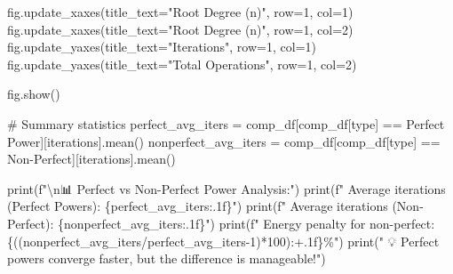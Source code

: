 \documentclass[
  letterpaper,
  DIV=11,
  numbers=noendperiod]{scrartcl}
\newenvironment{Shaded}{\begin{snugshade}}{\end{snugshade}}
\newcommand{\BuiltInTok}[1]{\textcolor[rgb]{0.00,0.23,0.31}{#1}}
\newcommand{\CharTok}[1]{\textcolor[rgb]{0.13,0.47,0.30}{#1}}
\newcommand{\CommentTok}[1]{\textcolor[rgb]{0.37,0.37,0.37}{#1}}
\newcommand{\DecValTok}[1]{\textcolor[rgb]{0.68,0.00,0.00}{#1}}
\newcommand{\NormalTok}[1]{\textcolor[rgb]{0.00,0.23,0.31}{#1}}
\newcommand{\OperatorTok}[1]{\textcolor[rgb]{0.37,0.37,0.37}{#1}}
\newcommand{\SpecialCharTok}[1]{\textcolor[rgb]{0.37,0.37,0.37}{#1}}
\newcommand{\SpecialStringTok}[1]{\textcolor[rgb]{0.13,0.47,0.30}{#1}}
\newcommand{\StringTok}[1]{\textcolor[rgb]{0.13,0.47,0.30}{#1}}
\begin{document}
\begin{Shaded}
\begin{Highlighting}[]
\NormalTok{fig.update\_xaxes(title\_text}\OperatorTok{=}\StringTok{"Root Degree (n)"}\NormalTok{, row}\OperatorTok{=}\DecValTok{1}\NormalTok{, col}\OperatorTok{=}\DecValTok{1}\NormalTok{)}
\NormalTok{fig.update\_xaxes(title\_text}\OperatorTok{=}\StringTok{"Root Degree (n)"}\NormalTok{, row}\OperatorTok{=}\DecValTok{1}\NormalTok{, col}\OperatorTok{=}\DecValTok{2}\NormalTok{)}
\NormalTok{fig.update\_yaxes(title\_text}\OperatorTok{=}\StringTok{"Iterations"}\NormalTok{, row}\OperatorTok{=}\DecValTok{1}\NormalTok{, col}\OperatorTok{=}\DecValTok{1}\NormalTok{)}
\NormalTok{fig.update\_yaxes(title\_text}\OperatorTok{=}\StringTok{"Total Operations"}\NormalTok{, row}\OperatorTok{=}\DecValTok{1}\NormalTok{, col}\OperatorTok{=}\DecValTok{2}\NormalTok{)}

\NormalTok{fig.show()}


\CommentTok{\# Summary statistics}
\NormalTok{perfect\_avg\_iters }\OperatorTok{=}\NormalTok{ comp\_df[comp\_df[}\StringTok{\textquotesingle{}type\textquotesingle{}}\NormalTok{] }\OperatorTok{==} \StringTok{\textquotesingle{}Perfect Power\textquotesingle{}}\NormalTok{][}\StringTok{\textquotesingle{}iterations\textquotesingle{}}\NormalTok{].mean()}
\NormalTok{nonperfect\_avg\_iters }\OperatorTok{=}\NormalTok{ comp\_df[comp\_df[}\StringTok{\textquotesingle{}type\textquotesingle{}}\NormalTok{] }\OperatorTok{==} \StringTok{\textquotesingle{}Non{-}Perfect\textquotesingle{}}\NormalTok{][}\StringTok{\textquotesingle{}iterations\textquotesingle{}}\NormalTok{].mean()}

\BuiltInTok{print}\NormalTok{(}\SpecialStringTok{f"}\CharTok{\textbackslash{}n}\SpecialStringTok{📊 Perfect vs Non{-}Perfect Power Analysis:"}\NormalTok{)}
\BuiltInTok{print}\NormalTok{(}\SpecialStringTok{f"   Average iterations (Perfect Powers): }\SpecialCharTok{\{}\NormalTok{perfect\_avg\_iters}\SpecialCharTok{:.1f\}}\SpecialStringTok{"}\NormalTok{)}
\BuiltInTok{print}\NormalTok{(}\SpecialStringTok{f"   Average iterations (Non{-}Perfect): }\SpecialCharTok{\{}\NormalTok{nonperfect\_avg\_iters}\SpecialCharTok{:.1f\}}\SpecialStringTok{"}\NormalTok{)}
\BuiltInTok{print}\NormalTok{(}\SpecialStringTok{f"   Energy penalty for non{-}perfect: }\SpecialCharTok{\{}\NormalTok{((nonperfect\_avg\_iters}\OperatorTok{/}\NormalTok{perfect\_avg\_iters}\OperatorTok{{-}}\DecValTok{1}\NormalTok{)}\OperatorTok{*}\DecValTok{100}\NormalTok{)}\SpecialCharTok{:+.1f\}}\SpecialStringTok{\%"}\NormalTok{)}
\BuiltInTok{print}\NormalTok{(}\StringTok{"   💡 Perfect powers converge faster, but the difference is manageable!"}\NormalTok{)}
\end{Highlighting}
\end{Shaded}
\end{document}
